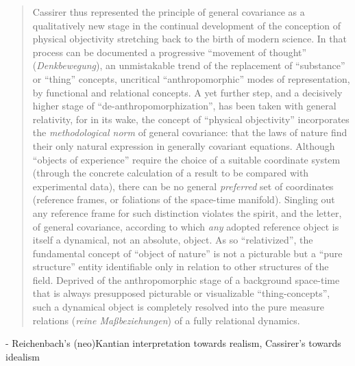 \begin{quote}
    Cassirer thus represented the principle of general covariance as a qualitatively new stage in the continual development of the conception of physical objectivity stretching back to the birth of modern science.  In that process can be documented a progressive ``movement of thought'' (\emph{Denkbewegung}), an unmistakable trend of the replacement of ``substance'' or ``thing'' concepts, uncritical ``anthropomorphic'' modes of representation, by functional and relational concepts.  A yet further step, and a decisively higher stage of ``de-anthropomorphization'', has been taken with general relativity, for in its wake, the concept of ``physical objectivity'' incorporates the \emph{methodological norm} of general covariance: that the laws of nature find their only natural expression in generally covariant equations.  Although ``objects of experience'' require the choice of a suitable coordinate system (through the concrete calculation of a result to be compared with experimental data), there can be no general \emph{preferred} set of coordinates (reference frames, or foliations of the space-time manifold).  Singling out any reference frame for such distinction violates the spirit, and the letter, of general covariance, according to which \emph{any} adopted reference object is itself a dynamical, not an absolute, object.  As so ``relativized'', the fundamental concept of ``object of nature'' is not a picturable but a ``pure structure'' entity identifiable only in relation to other structures of the field.  Deprived of the anthropomorphic stage of a background space-time that is always presupposed picturable or visualizable ``thing-concepts'', such a dynamical object is completely resolved into the pure measure relations (\emph{reine Ma{\ss}beziehungen}) of a fully relational dynamics.
    
    \citep[p. 45]{Ryckman2005}
\end{quote}

- Reichenbach's (neo)Kantian interpretation towards realism, Cassirer's towards idealism

